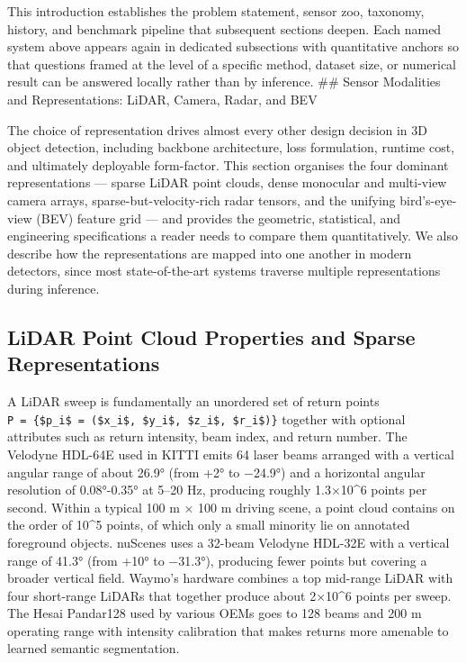 This introduction establishes the problem statement, sensor zoo, taxonomy, history, and benchmark pipeline that subsequent sections deepen. Each named system above appears again in dedicated subsections with quantitative anchors so that questions framed at the level of a specific method, dataset size, or numerical result can be answered locally rather than by inference.
\#\# Sensor Modalities and Representations: LiDAR, Camera, Radar, and BEV

The choice of representation drives almost every other design decision in 3D object detection, including backbone architecture, loss formulation, runtime cost, and ultimately deployable form-factor. This section organises the four dominant representations --- sparse LiDAR point clouds, dense monocular and multi-view camera arrays, sparse-but-velocity-rich radar tensors, and the unifying bird's-eye-view (BEV) feature grid --- and provides the geometric, statistical, and engineering specifications a reader needs to compare them quantitatively. We also describe how the representations are mapped into one another in modern detectors, since most state-of-the-art systems traverse multiple representations during inference.

\subsection{LiDAR Point Cloud Properties and Sparse Representations}\label{lidar-point-cloud-properties-and-sparse-representations}

A LiDAR sweep is fundamentally an unordered set of return points \texttt{P\ =\ \{\$p\_i\$\ =\ (\$x\_i\$,\ \$y\_i\$,\ \$z\_i\$,\ \$r\_i\$)\}} together with optional attributes such as return intensity, beam index, and return number. The Velodyne HDL-64E used in KITTI emits 64 laser beams arranged with a vertical angular range of about 26.9° (from +2° to −24.9°) and a horizontal angular resolution of 0.08°-0.35° at 5--20 Hz, producing roughly 1.3×10\^{}6 points per second. Within a typical 100 m × 100 m driving scene, a point cloud contains on the order of 10\^{}5 points, of which only a small minority lie on annotated foreground objects. nuScenes uses a 32-beam Velodyne HDL-32E with a vertical range of 41.3° (from +10° to −31.3°), producing fewer points but covering a broader vertical field. Waymo's hardware combines a top mid-range LiDAR with four short-range LiDARs that together produce about 2×10\^{}6 points per sweep. The Hesai Pandar128 used by various OEMs goes to 128 beams and 200 m operating range with intensity calibration that makes returns more amenable to learned semantic segmentation.

